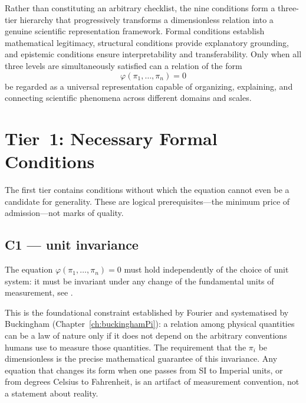  Rather than constituting an arbitrary checklist, the nine conditions form a three-tier hierarchy that progressively transforms a dimensionless relation into a genuine scientific representation framework. Formal conditions establish mathematical legitimacy, structural conditions provide explanatory grounding, and epistemic conditions ensure interpretability and transferability. Only when all three levels are simultaneously satisfied can a relation of the form
\[
\varphi(\pi_1,\ldots,\pi_n)=0
\]
be regarded as a universal representation capable of organizing, explaining, and connecting scientific phenomena across different domains and scales.

\section{Tier~1: Necessary Formal Conditions}
\label{sec:ucq:tier1}

The first tier contains conditions without which the equation
cannot even be a candidate for generality.  These are logical
prerequisites---the minimum price of admission---not marks of
quality.

\subsection{C1 --- unit invariance}

\begin{condbox}
\begin{condition}\label{cond:ucq:unit}
The equation $\varphi(\pi_1,\ldots,\pi_n)=0$ must hold
independently of the choice of unit system: it must be invariant
under any change of the fundamental units of measurement, see \cite{FalmagneD15}.
\end{condition}
\end{condbox}

This is the foundational constraint established by Fourier and
systematised by Buckingham (Chapter~\ref{ch:buckinghamPi}): a
relation among physical quantities can be a law of nature only if
it does not depend on the arbitrary conventions humans use to
measure those quantities.  The requirement that the $\pi_i$ be
dimensionless is the precise mathematical guarantee of this
invariance.  Any equation that changes its form when one passes
from SI to Imperial units, or from degrees Celsius to Fahrenheit,
is an artifact of measurement convention, not a statement about
reality.

